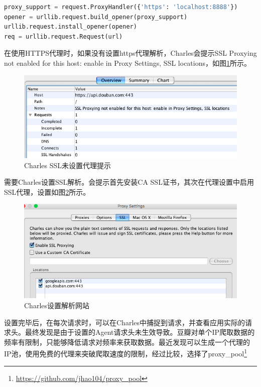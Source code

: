 \documentclass[8pt]{book}
\numberwithin{dummy}{section}
\theoremstyle{ocrenumbox}
\theoremstyle{blacknumex}
\theoremstyle{blacknumbox}
\theoremstyle{ocrenum}
\newlength\esp
\begin{document}
\begin{lstlisting}[language=Python]
proxy_support = request.ProxyHandler({'https': 'localhost:8888'})
opener = urllib.request.build_opener(proxy_support)
urllib.request.install_opener(opener)
req = urllib.request.Request(url)
\end{lstlisting}

在使用HTTPS代理时，如果没有设置https代理解析，Charles会提示SSL Proxying not enabled for this host: enable in Proxy Settings, SSL locations，如图\ref{fig:charlesssltips}所示。

\begin{figure}[htbp]
	\centering
	\includegraphics[scale=0.6]{charlesssltips.png}
	\caption{Charles SSL未设置代理提示}
	\label{fig:charlesssltips}
\end{figure}

需要Charles设置SSL解析。会提示首先安装CA SSL证书，其次在代理设置中启用SSL代理，设置如图\ref{fig:httpcharlesparse}所示。

\begin{figure}[htbp]
	\centering
	\includegraphics[scale=0.5]{httpcharlesparse.png}
	\caption{Charles设置解析网站}
	\label{fig:httpcharlesparse}
\end{figure}

设置完毕后，在每次请求时，可以在Charles中捕捉到请求，并查看应用实际的请求头。最终发现是由于设置的Agent请求头未生效导致。豆瓣对单个IP爬取数据的频率有限制，只能够降低请求对频率来获取数据。最近发现可以生成一个代理的IP池，使用免费的代理来突破爬取速度的限制，经过比较，选择了proxy\_pool\footnote{\url{https://github.com/jhao104/proxy_pool}}
\end{document}
